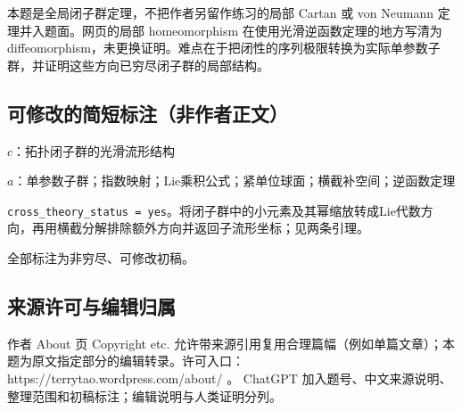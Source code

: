 \documentclass[UTF8,11pt]{ctexart}
\theoremstyle{definition}
\begin{document}
本题是全局闭子群定理，不把作者另留作练习的局部 Cartan 或 von Neumann 定理并入题面。网页的局部 homeomorphism 在使用光滑逆函数定理的地方写清为 diffeomorphism，未更换证明。难点在于把闭性的序列极限转换为实际单参数子群，并证明这些方向已穷尽闭子群的局部结构。
\subsection*{可修改的简短标注（非作者正文）}
$c$：拓扑闭子群的光滑流形结构

$a$：单参数子群；指数映射；Lie乘积公式；紧单位球面；横截补空间；逆函数定理

\texttt{cross\_theory\_status = yes}。将闭子群中的小元素及其幂缩放转成Lie代数方向，再用横截分解排除额外方向并返回子流形坐标；见两条引理。

全部标注为非穷尽、可修改初稿。
\subsection*{来源许可与编辑归属}
作者 About 页 Copyright etc. 允许带来源引用复用合理篇幅（例如单篇文章）；本题为原文指定部分的编辑转录。许可入口：https://terrytao.wordpress.com/about/ 。
ChatGPT 加入题号、中文来源说明、整理范围和初稿标注；编辑说明与人类证明分列。
\end{document}
